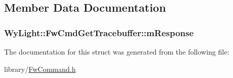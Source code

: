 \subsection{Member Data Documentation}
\hypertarget{struct_wy_light_1_1_fw_cmd_get_tracebuffer_ae7ba6567ab462ad9237f4a35365fcb5f}{
\subsubsection[{m\-Response}]{ Wy\-Light\-::\-Fw\-Cmd\-Get\-Tracebuffer\-::m\-Response}}\label{struct_wy_light_1_1_fw_cmd_get_tracebuffer_ae7ba6567ab462ad9237f4a35365fcb5f}


The documentation for this struct was generated from the following file\-:\begin{DoxyCompactItemize}
\item 
library/\hyperlink{_fw_command_8h}{Fw\-Command.\-h}\end{DoxyCompactItemize}
